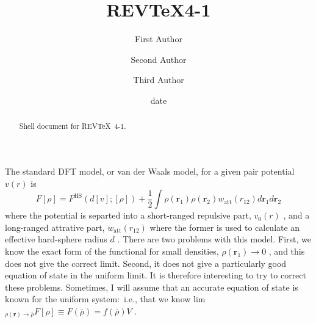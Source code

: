 \documentclass[aps,preprint]{revtex4-1}%
\begin{document}
\title[Short title for running header]{REV\TeX 4-1}
\author{First Author}
\author{Second Author}
\author{Third Author}

\begin{abstract}
Shell document for REV\TeX\ 4-1.

\end{abstract}
\date[Date text]{date}




\maketitle


The standard DFT model, or van der Waals model, for a given pair potential
$v\left(  r\right)  $ is
\begin{equation}
F\left[  \rho\right]  =F^{\text{HS}}\left(  d\left[  v\right]  ;\left[
\rho\right]  \right)  +\frac{1}{2}\int\rho\left(  \mathbf{r}_{1}\right)
\rho\left(  \mathbf{r}_{2}\right)  w_{\text{att}}\left(  r_{12}\right)
d\mathbf{r}_{1}d\mathbf{r}_{2}%
\end{equation}
where the potential is separted into a short-ranged repulsive part,
$v_{0}\left(  r\right)  $ , and a long-ranged attrative part, $w_{\text{att}%
}\left(  r_{12}\right)  $ where the former is used to calculate an effective
hard-sphere radius $d$ . There are two problems with this model. First, we
know the exact form of the functional for small densities, $\rho\left(
\mathbf{r}_{1}\right)  \rightarrow0$ , and this does not give the correct
limit. Second, it does not give a particularly good equation of state in the
uniform limit. It is therefore interesting to try to correct these problems.
Sometimes, I will assume that an accurate equation of state is known for the
uniform system:\ i.e., that we know lim$_{\rho\left(  \mathbf{r}\right)
\rightarrow\overline{\rho}}F\left[  \rho\right]  \equiv F\left(
\overline{\rho}\right)  =f\left(  \overline{\rho}\right)  V$ .
\end{document}
